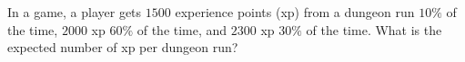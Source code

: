 In a game, a player gets $1500$ experience points (xp) from a dungeon run $10\%$ of the time, $2000$ xp $60\%$ of the time, and $2300$ xp $30\%$ of the time. What is the expected number of xp per dungeon run?
